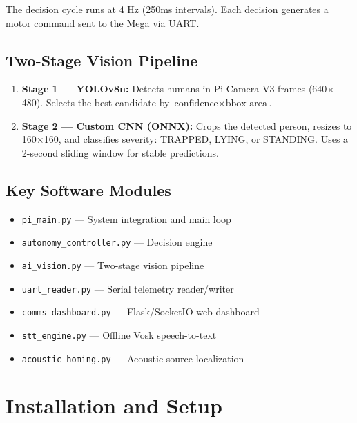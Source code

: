 \documentclass[11pt,a4paper]{article}
\begin{document}
The decision cycle runs at 4 Hz (250ms intervals). Each decision generates a motor command sent to the Mega via UART.

\subsection{Two-Stage Vision Pipeline}
\begin{enumerate}
    \item \textbf{Stage 1 --- YOLOv8n:} Detects humans in Pi Camera V3 frames (640$\times$480). Selects the best candidate by $\text{confidence} \times \text{bbox area}$.
    \item \textbf{Stage 2 --- Custom CNN (ONNX):} Crops the detected person, resizes to 160$\times$160, and classifies severity: TRAPPED, LYING, or STANDING. Uses a 2-second sliding window for stable predictions.
\end{enumerate}

\subsection{Key Software Modules}
\begin{itemize}
    \item \texttt{pi\_main.py} --- System integration and main loop
    \item \texttt{autonomy\_controller.py} --- Decision engine
    \item \texttt{ai\_vision.py} --- Two-stage vision pipeline
    \item \texttt{uart\_reader.py} --- Serial telemetry reader/writer
    \item \texttt{comms\_dashboard.py} --- Flask/SocketIO web dashboard
    \item \texttt{stt\_engine.py} --- Offline Vosk speech-to-text
    \item \texttt{acoustic\_homing.py} --- Acoustic source localization
\end{itemize}

\section{Installation and Setup}
\end{document}
